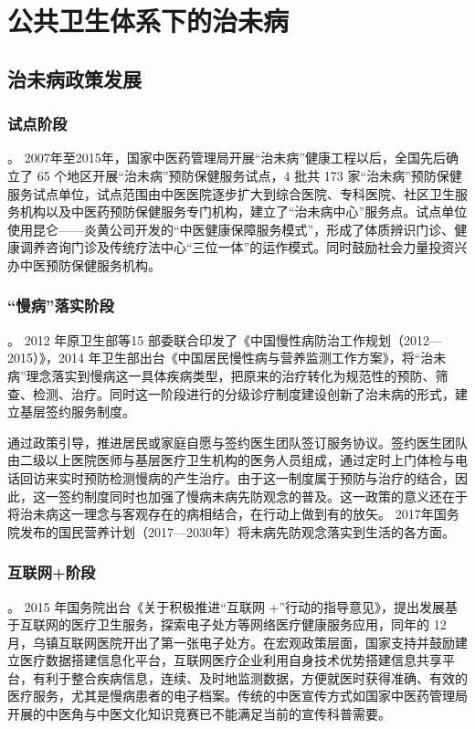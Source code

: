 \section{公共卫生体系下的治未病}
\subsection{治未病政策发展}
\subsubsection{试点阶段}。
2007年至2015年，国家中医药管理局开展“治未病”健康工程以后，全国先后确立了 65 个地区开展“治未病”预防保健服务试点，4 批共 173 家“治未病”预防保健服务试点单位，试点范围由中医医院逐步扩大到综合医院、专科医院、社区卫生服务机构以及中医药预防保健服务专门机构，建立了“治未病中心”服务点。试点单位使用昆仑——炎黄公司开发的“中医健康保障服务模式”，形成了体质辨识门诊、健康调养咨询门诊及传统疗法中心“三位一体”的运作模式。同时鼓励社会力量投资兴办中医预防保健服务机构。
\subsubsection{“慢病”落实阶段}。
2012 年原卫生部等15 部委联合印发了《中国慢性病防治工作规划（2012—2015）》，2014 年卫生部出台《中国居民慢性病与营养监测工作方案》，将“治未病”理念落实到慢病这一具体疾病类型，把原来的治疗转化为规范性的预防、筛查、检测、治疗。同时这一阶段进行的分级诊疗制度建设创新了治未病的形式，建立基层签约服务制度。

通过政策引导，推进居民或家庭自愿与签约医生团队签订服务协议。签约医生团队由二级以上医院医师与基层医疗卫生机构的医务人员组成，通过定时上门体检与电话回访来实时预防检测慢病的产生治疗。由于这一制度属于预防与治疗的结合，因此，这一签约制度同时也加强了慢病未病先防观念的普及。这一政策的意义还在于将治未病这一理念与客观存在的病相结合，在行动上做到有的放矢。
2017年国务院发布的国民营养计划（2017—2030年）将未病先防观念落实到生活的各方面。
\subsubsection{互联网+阶段}。
2015 年国务院出台《关于积极推进“互联网 +”行动的指导意见》，提出发展基于互联网的医疗卫生服务，探索电子处方等网络医疗健康服务应用，同年的 12 月，乌镇互联网医院开出了第一张电子处方。在宏观政策层面，国家支持并鼓励建立医疗数据搭建信息化平台，互联网医疗企业利用自身技术优势搭建信息共享平台，有利于整合疾病信息，连续、及时地监测数据，方便就医时获得准确、有效的医疗服务，尤其是慢病患者的电子档案。传统的中医宣传方式如国家中医药管理局开展的中医角与中医文化知识竞赛已不能满足当前的宣传科普需要。

